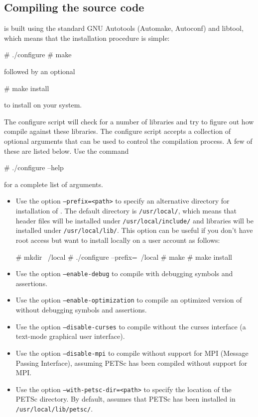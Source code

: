 

\subsection{Compiling the source code}

\dolfin{} is built using the standard GNU Autotools (Automake,
Autoconf) and libtool, which means that the installation procedure is simple:
\begin{code}
  # ./configure
  # make
\end{code}
followed by an optional
\begin{code}
  # make install
\end{code}
to install \dolfin{} on your system.

The configure script will check for a number of libraries and try
to figure out how compile \dolfin{} against these libraries. The
configure script accepts a collection of optional arguments that can be
used to control the compilation process. A few of these are listed
below. Use the command
\begin{code}
  # ./configure --help
\end{code}
for a complete list of arguments.

\begin{itemize}
\item
  Use the option \texttt{--prefix=<path>} to specify an alternative
  directory for installation of \dolfin{}. The default directory is
  \texttt{/usr/local/}, which means that header files will be
  installed under \texttt{/usr/local/include/} and libraries will be
  installed under \texttt{/usr/local/lib/}. This option can be useful
  if you don't have root access but want to install \dolfin{} locally
  on a user account as follows:
  \begin{code}
    # mkdir ~/local
    # ./configure --prefix=~/local
    # make
    # make install
  \end{code}
\item
  Use the option \texttt{--enable-debug} to compile \dolfin{} with
  debugging symbols and assertions.
\item
  Use the option \texttt{--enable-optimization} to compile an
  optimized version of \dolfin{} without debugging symbols
  and assertions.
\item
  Use the option \texttt{--disable-curses} to compile \dolfin{}
  without the curses interface (a text-mode graphical user interface).
\item
  Use the option \texttt{--disable-mpi} to compile \dolfin{} without
  support for MPI (Message Passing Interface), assuming PETSc has been
  compiled without support for MPI.
\item
  Use the option \texttt{--with-petsc-dir=<path>} to specify the
  location of the PETSc directory. By default, \dolfin{} assumes that
  PETSc has been installed in \texttt{/usr/local/lib/petsc/}.
\end{itemize}

